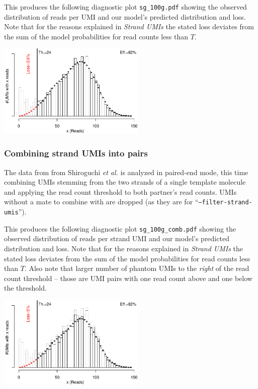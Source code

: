 \documentclass[10pt]{article}
\begin{document}
This produces the following diagnostic plot \texttt{sg\_100g.pdf} showing the observed distribution of reads per UMI and our model's predicted distribution and loss. Note that for the reasons explained in \emph{Strand UMIs} the stated loss deviates from the sum of the model probabilities for read counts less than $T$.

{\centering \includegraphics[width=7cm]{../examples/sg_100g.pdf}\\}

\subsubsection*{Combining strand UMIs into pairs}

The data from from Shiroguchi \textit{et al.} is analyzed in paired-end mode, this time combining UMIs stemming from the two strands of a single template molecule and applying the read count threshold to both partner's read counts. UMIs without a mate to combine with are dropped (as they are for ``\texttt{--filter-strand-umis}'').


This produces the following diagnostic plot \texttt{sg\_100g\_comb.pdf} showing the observed distribution of reads per strand UMI and our model's predicted distribution and loss. Note that for the reasons explained in \emph{Strand UMIs} the stated loss deviates from the sum of the model probabilities for read counts less than $T$. Also note that larger number of phantom UMIs to the \emph{right} of the read count threshold -- those are UMI pairs with one read count above and one below the threshold.

{\centering \includegraphics[width=7cm]{../examples/sg_100g_comb.pdf}\\}
\end{document}

